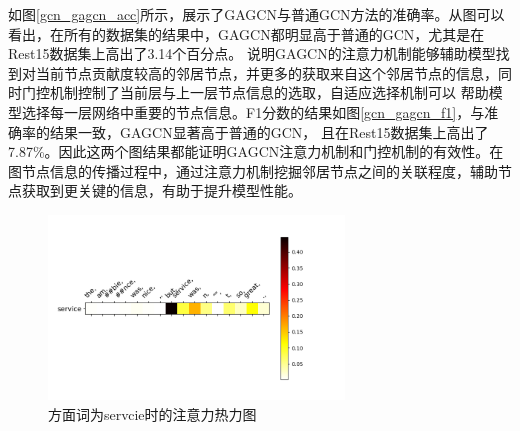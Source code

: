 

如图\ref{gcn_gagcn_acc}所示，展示了GAGCN与普通GCN方法的准确率。从图可以看出，在所有的数据集的结果中，GAGCN都明显高于普通的GCN，尤其是在Rest15数据集上高出了3.14个百分点。
说明GAGCN的注意力机制能够辅助模型找到对当前节点贡献度较高的邻居节点，并更多的获取来自这个邻居节点的信息，同时门控机制控制了当前层与上一层节点信息的选取，自适应选择机制可以
帮助模型选择每一层网络中重要的节点信息。F1分数的结果如图\ref{gcn_gagcn_f1}，与准确率的结果一致，GAGCN显著高于普通的GCN，
且在Rest15数据集上高出了7.87\%。因此这两个图结果都能证明GAGCN注意力机制和门控机制的有效性。在图节点信息的传播过程中，通过注意力机制挖掘邻居节点之间的关联程度，辅助节点获取到更关键的信息，有助于提升模型性能。


\begin{figure}[htb]
    \setlength{\belowcaptionskip}{0pt}
    \centering
    \includegraphics[width=0.7\textwidth]{pic/att3_1.png}
    \caption{方面词为servcie时的注意力热力图}
    \label{att3_1}
\end{figure}

